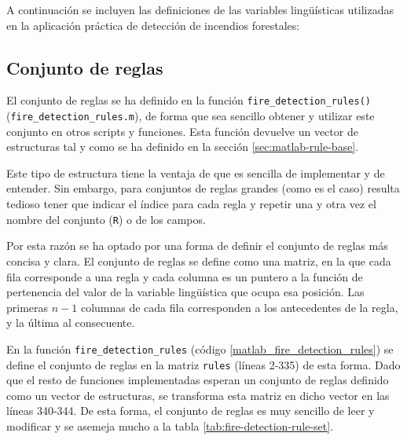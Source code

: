 A continuación se incluyen las definiciones de las variables lingüísticas utilizadas en la aplicación práctica de detección de incendios forestales:













\subsection{Conjunto de reglas}

El conjunto de reglas se ha definido en la función \lstinline|fire_detection_rules()| (\lstinline|fire_detection_rules.m|), de forma que sea sencillo obtener y utilizar este conjunto en otros scripts y funciones. Esta función devuelve un vector de estructuras tal y como se ha definido en la sección \ref{sec:matlab-rule-base}.

Este tipo de estructura tiene la ventaja de que es sencilla de implementar y de entender. Sin embargo, para conjuntos de reglas grandes (como es el caso) resulta tedioso tener que indicar el índice para cada regla y repetir una y otra vez el nombre del conjunto (\lstinline|R|) o de los campos. 

Por esta razón se ha optado por una forma de definir el conjunto de reglas más concisa y clara. El conjunto de reglas se define como una matriz, en la que cada fila corresponde a una regla y cada columna es un puntero a la función de pertenencia del valor de la variable lingüística que ocupa esa posición. Las primeras $n-1$ columnas de cada fila corresponden a los antecedentes de la regla, y la última al consecuente.

En la función  \lstinline|fire_detection_rules| (código \ref{matlab_fire_detection_rules}) se define el conjunto de reglas en la matriz \lstinline|rules| (líneas 2-335) de esta forma. Dado que el resto de funciones implementadas esperan un conjunto de reglas definido como un vector de estructuras, se transforma esta matriz en dicho vector en las líneas 340-344. De esta forma, el conjunto de reglas es muy sencillo de leer y modificar y se asemeja mucho a la tabla \ref{tab:fire-detection-rule-set}.

\lstset{linewidth=18cm}
